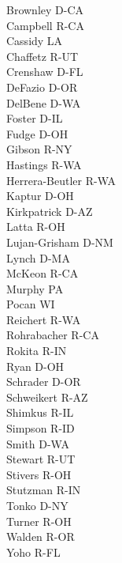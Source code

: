 \begin{multicols}{3}
Brownley D-CA \\
Campbell R-CA \\
Cassidy LA \\
Chaffetz R-UT \\
Crenshaw D-FL \\
DeFazio D-OR \\
DelBene D-WA \\
Foster D-IL \\
Fudge D-OH \\
Gibson R-NY \\
Hastings R-WA \\
Herrera-Beutler R-WA \\
Kaptur D-OH \\
Kirkpatrick D-AZ \\
Latta R-OH \\
Lujan-Grisham D-NM \\
Lynch D-MA \\
McKeon R-CA \\
Murphy PA \\
Pocan WI \\
Reichert R-WA \\
Rohrabacher R-CA \\
Rokita R-IN \\
Ryan D-OH \\
Schrader D-OR \\
Schweikert R-AZ \\
Shimkus R-IL \\
Simpson R-ID \\
Smith D-WA \\
Stewart R-UT \\
Stivers R-OH \\
Stutzman R-IN \\
Tonko D-NY \\
Turner R-OH \\
Walden R-OR \\
Yoho R-FL \\
\end{multicols}
